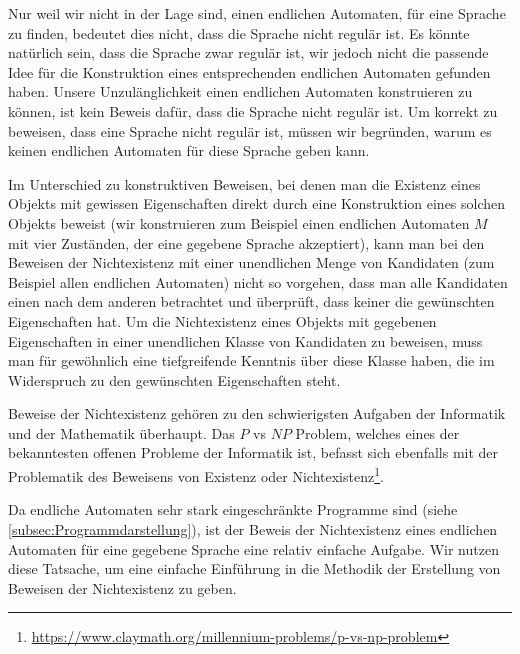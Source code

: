 Nur weil wir nicht in der Lage sind, einen endlichen Automaten, für eine Sprache zu finden, bedeutet dies nicht, dass die Sprache nicht regulär ist. Es könnte natürlich sein, dass die Sprache zwar regulär ist, wir jedoch nicht die passende Idee für die Konstruktion eines entsprechenden endlichen Automaten gefunden haben. Unsere Unzulänglichkeit einen endlichen Automaten konstruieren zu können, ist kein Beweis dafür, dass die Sprache nicht regulär ist. Um korrekt zu beweisen, dass eine Sprache nicht regulär ist, müssen wir begründen, warum es keinen endlichen Automaten für diese Sprache geben kann.

Im Unterschied zu konstruktiven Beweisen, bei denen man die Existenz
eines Objekts mit gewissen Eigenschaften direkt durch eine Konstruktion eines solchen
Objekts beweist (wir konstruieren zum Beispiel einen endlichen Automaten $M$ mit vier Zuständen, der
eine gegebene Sprache akzeptiert), kann man bei den Beweisen der Nichtexistenz mit
einer unendlichen Menge von Kandidaten (zum Beispiel allen endlichen Automaten)
nicht so vorgehen, dass man alle Kandidaten einen nach dem anderen betrachtet und
überprüft, dass keiner die gewünschten Eigenschaften hat. Um die Nichtexistenz eines
Objekts mit gegebenen Eigenschaften in einer unendlichen Klasse von Kandidaten zu
beweisen, muss man für gewöhnlich eine tiefgreifende Kenntnis über diese Klasse haben,
die im Widerspruch zu den gewünschten Eigenschaften steht.

Beweise der Nichtexistenz gehören zu den schwierigsten Aufgaben der Informatik und der Mathematik überhaupt. Das $P$ vs $NP$ Problem, welches eines der bekanntesten offenen Probleme der Informatik ist, befasst sich ebenfalls mit der Problematik des Beweisens von Existenz oder Nichtexistenz\footnote{\url{https://www.claymath.org/millennium-problems/p-vs-np-problem}}.

Da endliche Automaten sehr stark eingeschränkte Programme sind (siehe \cref{subsec:Programmdarstellung}), ist der Beweis der Nichtexistenz eines endlichen Automaten für eine gegebene Sprache eine relativ einfache Aufgabe. Wir nutzen diese Tatsache, um eine einfache
Einführung in die Methodik der Erstellung von Beweisen der Nichtexistenz zu geben.

